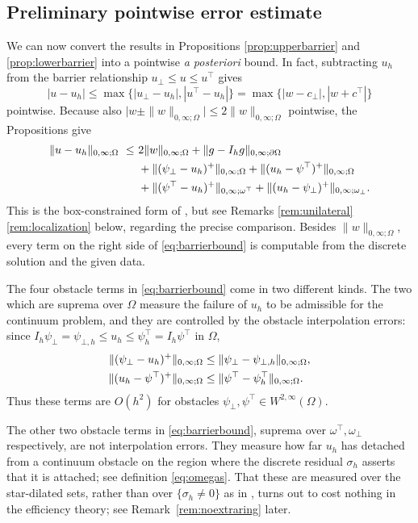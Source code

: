 \documentclass[12pt]{amsart}
\numberwithin{equation}{section}
\theoremstyle{plain}
\theoremstyle{definition}
\theoremstyle{remark}
\newcommand{\Om}{\Omega}
\newcommand{\dOm}{\partial\Omega}
\newcommand{\psilo}{\psi_\bot}
\newcommand{\psiup}{\psi^\top}
\newcommand{\psiloh}{\psi_{\bot,h}}
\newcommand{\psiuph}{\psi^\top_h}
\newcommand{\Ih}{I_h}
\newcommand{\ombot}{\omega_\bot}
\newcommand{\omtop}{\omega^\top}
\begin{document}
\subsection{Preliminary pointwise error estimate}  We can now convert the results in Propositions \ref{prop:upperbarrier} and \ref{prop:lowerbarrier} into a pointwise \emph{a posteriori} bound.  In fact, subtracting $u_h$ from the barrier relationship $u_\bot \le u \le u^\top$ gives
\begin{equation}
\label{eq:maxbarriers}
|u-u_h| \le \max \{|u_\bot-u_h|, |u^\top-u_h|\} = \max \{|w-c_\bot|, |w+c^\top|\}
\end{equation}
pointwise.  Because also $\bigl|w \pm \|w\|_{0,\infty;\Om}\bigr| \le 2 \|w\|_{0,\infty;\Om}$ pointwise, the Propositions give
\begin{align}
\label{eq:barrierbound}
  \|u-u_h\|_{0,\infty;\Om} \ \le\ & 2\|w\|_{0,\infty;\Om} + \|g-\Ih g\|_{0,\infty;\dOm} \\
  &+ \|(\psilo-u_h)^+\|_{0,\infty;\Om} + \|(u_h-\psiup)^+\|_{0,\infty;\Om} \notag \\
  &+ \|(\psiup-u_h)^+\|_{0,\infty;\omtop} + \|(u_h-\psilo)^+\|_{0,\infty;\ombot}. \notag
\end{align}
This is the box-constrained form of \cite[formula (4.8)]{NSV03}, but see Remarks \ref{rem:unilateral}\textendash\ref{rem:localization} below, regarding the precise comparison.  Besides $\|w\|_{0,\infty;\Om}$, every term on the right side of \eqref{eq:barrierbound} is computable from the discrete solution and the given data.

The four obstacle terms in \eqref{eq:barrierbound} come in two different kinds.  The two which are suprema over $\Om$ measure the failure of $u_h$ to be admissible for the continuum problem, and they are controlled by the obstacle interpolation errors: since $\Ih \psilo = \psiloh \le u_h \le \psiuph = \Ih \psiup$ in $\Om$,
\begin{align}
\label{eq:violationbound}
  \|(\psilo-u_h)^+\|_{0,\infty;\Om} &\le \|\psilo-\psiloh\|_{0,\infty;\Om}, \\
  \|(u_h-\psiup)^+\|_{0,\infty;\Om} &\le \|\psiup-\psiuph\|_{0,\infty;\Om}. \notag
\end{align}
Thus these terms are $O(h^2)$ for obstacles $\psilo,\psiup \in W^{2,\infty}(\Om)$.

The other two obstacle terms in \eqref{eq:barrierbound}, suprema over $\omtop,\ombot$ respectively, are not interpolation errors.  They measure how far $u_h$ has detached from a continuum obstacle on the region where the discrete residual $\sigma_h$ asserts that it is attached; see definition \eqref{eq:omegas}.  That these are measured over the star-dilated sets, rather than over $\{\sigma_h \ne 0\}$ as in \cite{NSV03}, turns out to cost nothing in the efficiency theory; see Remark~\ref{rem:noextraring} later.
\end{document}
